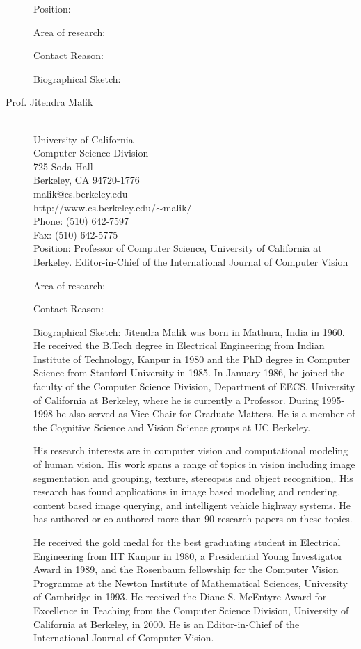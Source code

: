 \documentclass{gtcv}
\begin{document}
\begin{description}
\medskip
Position:

Area of research:

Contact Reason:

\smallskip
Biographical Sketch:


\item[Prof. Jitendra Malik]~\\
University of California \\
Computer Science Division \\
725 Soda Hall\\
Berkeley, CA 94720-1776 \\
malik@cs.berkeley.edu\\
http://www.cs.berkeley.edu/$\sim$malik/\\
Phone: (510) 642-7597 \\
Fax: (510) 642-5775 \\



\medskip
Position: Professor of Computer Science, University of California
at Berkeley. Editor-in-Chief of the International Journal of
Computer Vision

Area of research:

Contact Reason:

\smallskip
Biographical Sketch: Jitendra Malik was born in Mathura, India in
1960. He received the B.Tech degree in Electrical Engineering from
Indian Institute of Technology, Kanpur in 1980 and the PhD degree
in Computer Science from Stanford University in 1985. In January
1986, he joined the faculty of the Computer Science Division,
Department of EECS, University of California at Berkeley, where he
is currently a Professor. During 1995-1998 he also served as
Vice-Chair for Graduate Matters. He is a member of the Cognitive
Science and Vision Science groups at UC Berkeley.

His research interests are in computer vision and computational
modeling of human vision. His work spans a range of topics in
vision including image segmentation and grouping, texture,
stereopsis and object recognition,. His research has found
applications in image based modeling and rendering, content based
image querying, and intelligent vehicle highway systems. He has
authored or co-authored more than 90 research papers on these
topics.

He received the gold medal for the best graduating student in
Electrical Engineering from IIT Kanpur in 1980, a Presidential
Young Investigator Award in 1989, and the Rosenbaum fellowship for
the Computer Vision Programme at the Newton Institute of
Mathematical Sciences, University of Cambridge in 1993. He
received the Diane S. McEntyre Award for Excellence in Teaching
from the Computer Science Division, University of California at
Berkeley, in 2000. He is an Editor-in-Chief of the International
Journal of Computer Vision.


\end{description}
\end{document}
